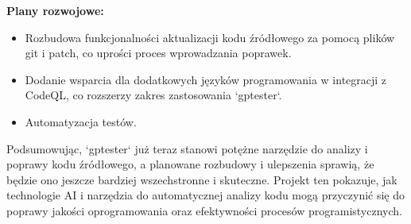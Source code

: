 \textbf{Plany rozwojowe:}
\begin{itemize}
    \item Rozbudowa funkcjonalności aktualizacji kodu źródłowego za pomocą plików git i patch, co uprości proces wprowadzania poprawek.
    \item Dodanie wsparcia dla dodatkowych języków programowania w integracji z CodeQL, co rozszerzy zakres zastosowania `gptester`.
    \item Automatyzacja testów.
\end{itemize}

Podsumowując, `gptester` już teraz stanowi potężne narzędzie do analizy i poprawy kodu źródłowego, a planowane rozbudowy i ulepszenia sprawią, że będzie ono jeszcze bardziej wszechstronne i skuteczne. Projekt ten pokazuje, jak technologie AI i narzędzia do automatycznej analizy kodu mogą przyczynić się do poprawy jakości oprogramowania oraz efektywności procesów programistycznych.

